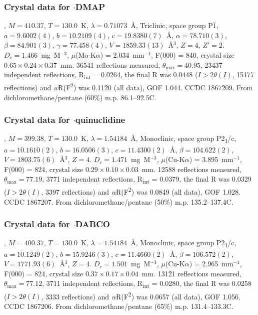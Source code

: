 \begin{refsection}
\subsubsection{Crystal data for \texorpdfstring{$\cdot$DMAP}{C21H21N3OSe}}
, $M=410.37$, $T=130.0$~K, $\lambda=0.71073$~\AA, Triclinic, space group P$\bar{1}$, $a = 9.6002(4)$, $b = 10.2109(4)$, $c = 19.8380(7)$~\AA, $\alpha = 78.710(3)$\degree, $\beta = 84.901(3)$\degree, $\gamma = 77.458(4)$\degree, $V = 1859.33(13)$~\AA$^{3}$, $Z = 4$, $Z\prime = 2$.
$D_{c}= 1.466$~mg~M$^{-3}$, $\mu$(Mo-K$\alpha$) = 2.034~mm$^{-1}$, F(000) = 840, crystal size $0.65 \times 0.24 \times 0.37$~mm.
36541 reflections measured, $\theta_{\mathrm{max}} = 40.95$\degree, 23437 independent reflections, R\textsubscript{int} = 0.0264, the final R was 0.0448 ($I > 2\theta(I)$, 15177 reflections) and \emph{w}R(F\textsuperscript{2}) was 0.1120 (all data), GOF 1.044.
CCDC 1867209.
From dichloromethane/pentane (60\%) m.p. 86.1--92.5\degree C.

\subsubsection{Crystal data for \texorpdfstring{$\cdot$quinuclidine}{C21H24N2OSe}}
, $M=399.38$, $T=130.0$~K, $\lambda=1.54184$~\AA, Monoclinic, space group P2\textsubscript{1}/c, $a = 10.1610(2)$, $b = 16.0506(3)$, $c = 11.4300(2)$~\AA, $\beta = 104.622(2)$\degree, $V = 1803.75(6)$~\AA$^{3}$, $Z = 4$.
$D_{c}= 1.471$~mg~M$^{-3}$, $\mu$(Cu-K$\alpha$) = 3.895~mm$^{-1}$, F(000) = 824, crystal size $0.29 \times 0.10 \times 0.03$~mm.
12588 reflections measured, $\theta_{\mathrm{max}} = 77.19$\degree, 3771 independent reflections, R\textsubscript{int} = 0.0379, the final R was 0.0329 ($I > 2\theta(I)$, 3397 reflections) and \emph{w}R(F\textsuperscript{2}) was 0.0849 (all data), GOF 1.028.
CCDC 1867207.
From dichloromethane/pentane (50\%) m.p. 135.2--137.4\degree C.

\subsubsection{Crystal data for \texorpdfstring{$\cdot$DABCO}{C20H23N3OSe}}
, $M=400.37$, $T=130.0$~K, $\lambda=1.54184$~\AA, Monoclinic, space group P2\textsubscript{1}/c, $a = 10.1249(2)$, $b = 15.9246(3)$, $c = 11.4660(2)$~\AA, $\beta = 106.572(2)$\degree, $V = 1771.93(6)$~\AA$^{3}$, $Z = 4$.
$D_{c} = 1.501$~mg~M$^{-3}$, $\mu$(Cu-K$\alpha$) = 2.965~mm$^{-1}$, F(000) = 824, crystal size $0.37 \times 0.17 \times 0.04$~mm.
13121 reflections measured, $\theta_{\mathrm{max}} = 77.12$\degree, 3711 independent reflections, R\textsubscript{int} = 0.0280, the final R was 0.0258 ($I > 2\theta(I)$, 3333 reflections) and \emph{w}R(F\textsuperscript{2}) was 0.0657 (all data), GOF 1.056.
CCDC 1867206.
From dichloromethane/pentane (65\%) m.p. 131.4--133.3\degree C.


\end{refsection}
